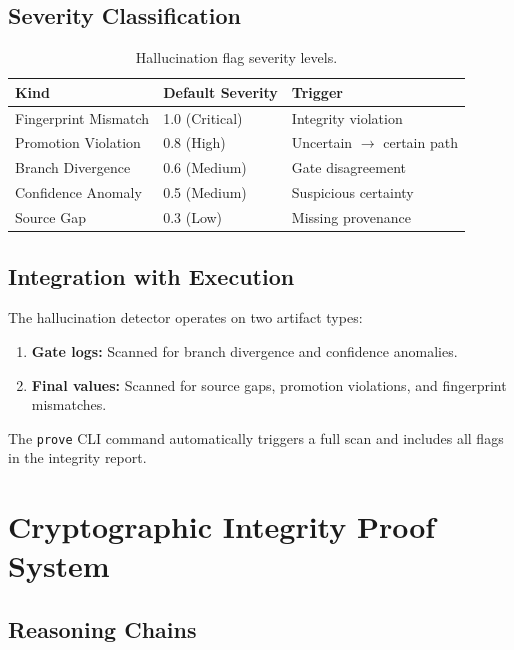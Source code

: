 \documentclass[11pt,a4paper]{article}
\begin{document}
\subsection{Severity Classification}

\begin{table}[H]
\centering
\caption{Hallucination flag severity levels.}
\label{tab:severity}
\begin{tabular}{@{}lll@{}}
\toprule
\textbf{Kind} & \textbf{Default Severity} & \textbf{Trigger} \\
\midrule
Fingerprint Mismatch  & 1.0 (Critical) & Integrity violation \\
Promotion Violation   & 0.8 (High)     & Uncertain $\to$ certain path \\
Branch Divergence     & 0.6 (Medium)   & Gate disagreement \\
Confidence Anomaly    & 0.5 (Medium)   & Suspicious certainty \\
Source Gap            & 0.3 (Low)      & Missing provenance \\
\bottomrule
\end{tabular}
\end{table}

\subsection{Integration with Execution}

The hallucination detector operates on two artifact types:
\begin{enumerate}[leftmargin=2em]
  \item \textbf{Gate logs:} Scanned for branch divergence and confidence anomalies.
  \item \textbf{Final values:} Scanned for source gaps, promotion violations,
    and fingerprint mismatches.
\end{enumerate}

The \texttt{prove} CLI command automatically triggers a full scan and includes
all flags in the integrity report.

\section{Cryptographic Integrity Proof System}
\label{sec:integrity}

\subsection{Reasoning Chains}
\end{document}
